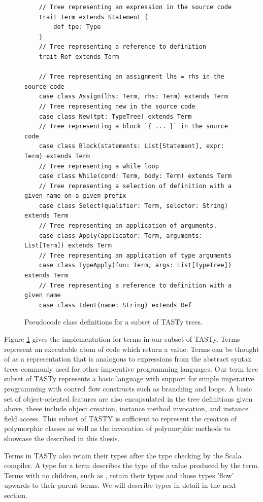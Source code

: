 \begin{figure}[!htb]
	\begin{verbatim}
	// Tree representing an expression in the source code
	trait Term extends Statement {
		def tpe: Type
	}
	// Tree representing a reference to definition      
	trait Ref extends Term             
	
	// Tree representing an assignment lhs = rhs in the source code
	case class Assign(lhs: Term, rhs: Term) extends Term
	// Tree representing new in the source code
	case class New(tpt: TypeTree) extends Term
	// Tree representing a block `{ ... }` in the source code
	case class Block(statements: List[Statement], expr: Term) extends Term
	// Tree representing a while loop
	case class While(cond: Term, body: Term) extends Term
	// Tree representing a selection of definition with a given name on a given prefix
	case class Select(qualifier: Term, selector: String) extends Term 
	// Tree representing an application of arguments.
	case class Apply(applicator: Term, arguments: List[Term]) extends Term
	// Tree representing an application of type arguments
	case class TypeApply(fun: Term, args: List[TypeTree]) extends Term
	// Tree representing a reference to definition with a given name
	case class Ident(name: String) extends Ref 
	\end{verbatim} 
	\caption{Pseudocode class definitions for a subset of TASTy trees.}
	\label{tasty:terms}
\end{figure}

Figure \ref{tasty:terms} gives the implementation for terms in our subset of TASTy.
Terms represent an executable atom of code which return a value.
Terms can be thought of as a representation that is analogous to expressions from the abstract syntax trees commonly used for other imperative programming languages.
Our term tree subset of TASTy represents a basic language with support for simple imperative programming with control flow constructs such as branching and loops.
A basic set of object-oriented features are also encapsulated in the tree definitions given above, these include object creation, instance method invocation, and instance field access.
This subset of TASTY is sufficient to represent the creation of polymorphic classes as well as the invocation of polymorphic methods to showcase the described in this thesis.

Terms in TASTy also retain their types after the type checking by the Scala compiler.
A type for a term describes the type of the value produced by the term.
Terms with no children, such as , retain their types and those types 'flow' upwards to their parent terms.
We will describe types in detail in the next section.

